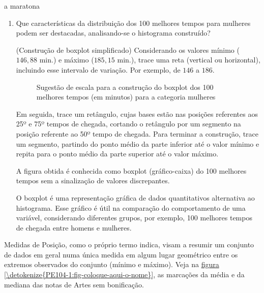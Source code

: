 \begin{task}{ a maratona}
\begin{enumerate}
\item Que características da distribuição dos 100 melhores tempos para mulheres podem ser destacadas, analisando-se o histograma construído?

(Construção de boxplot simplificado) Considerando os valores mínimo ($146{,}88$ min.) e máximo ($185{,}15$ min.), trace uma reta (vertical ou horizontal), incluindo esse intervalo de variação. Por exemplo, de $146$ a $186$.
\begin{figure}[H]
\centering


\caption{Sugestão de escala para a construção do boxplot dos 100 melhores tempos (em minutos) para a categoria mulheres}

\end{figure}

Em seguida, trace um retângulo, cujas bases estão nas posições referentes aos 25º e 75º tempos de chegada, cortando o retângulo por um segmento na posição referente ao 50º tempo de chegada. Para terminar a construção, trace um segmento, partindo do ponto médio da parte inferior até o valor mínimo e repita para o ponto médio da parte superior até o valor máximo.

A figura obtida é conhecida como boxplot (gráfico-caixa) do 100 melhores tempos sem a sinalização de valores discrepantes.

O boxplot é uma representação gráfica de dados quantitativos alternativa ao histograma. Esse gráfico é útil na comparação do comportamento de uma variável, considerando diferentes grupos, por exemplo, 100 melhores tempos de chegada entre homens e mulheres.
\end{enumerate}
\end{task}


\label{\detokenize{PE104-1:sec-organizando1}}\label{\detokenize{PE104-1::doc}}\label{\detokenize{PE104-1:organizando-as-ideias-medidas-de-posicao}}

Medidas de Posição, como o próprio termo indica, visam a resumir um conjunto de dados em geral numa única medida em algum lugar geométrico entre os extremos observados do conjunto (mínimo e máximo). Veja na \hyperref[\detokenize{PE104-1:fig-coloque-aqui-o-nome}]{figura \ref{\detokenize{PE104-1:fig-coloque-aqui-o-nome}}}, as marcações da média e da mediana das notas de Artes sem bonificação.

